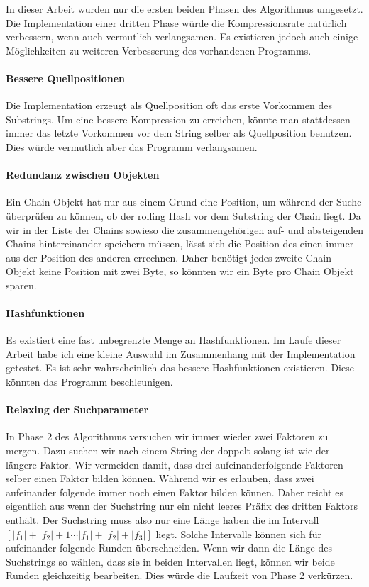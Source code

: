In dieser Arbeit wurden nur die ersten beiden Phasen des Algorithmus umgesetzt.
Die Implementation einer dritten Phase würde die Kompressionsrate natürlich verbessern, wenn auch vermutlich verlangsamen.
Es existieren jedoch auch einige  Möglichkeiten zu weiteren Verbesserung des vorhandenen Programms.
\paragraph{Bessere Quellpositionen}
Die Implementation erzeugt als Quellposition oft das erste Vorkommen des
Substrings. Um eine bessere Kompression zu erreichen, könnte man stattdessen
immer das letzte Vorkommen vor dem String selber als Quellposition
benutzen. Dies würde vermutlich aber das Programm verlangsamen.
\paragraph{Redundanz zwischen Objekten}
Ein Chain Objekt hat nur aus einem Grund eine Position, um während der
Suche überprüfen zu können, ob der rolling Hash vor dem Substring der
Chain liegt. Da wir in der Liste der Chains sowieso die
zusammengehörigen auf- und absteigenden Chains hintereinander speichern müssen,
lässt sich die Position des einen immer aus der Position des anderen
errechnen. Daher benötigt jedes zweite Chain Objekt keine Position mit
zwei Byte, so könnten wir ein Byte pro Chain Objekt sparen.
\paragraph{Hashfunktionen}
Es existiert eine fast unbegrenzte Menge an Hashfunktionen. Im Laufe
dieser Arbeit habe ich eine kleine Auswahl im Zusammenhang mit der
Implementation getestet. Es ist sehr wahrscheinlich das bessere
Hashfunktionen existieren. Diese könnten das Programm beschleunigen.
\paragraph{Relaxing der Suchparameter}
In Phase 2 des Algorithmus versuchen wir  immer wieder zwei Faktoren zu
mergen. Dazu suchen wir nach einem String der doppelt solang ist wie der
längere Faktor.
Wir vermeiden damit, dass drei aufeinanderfolgende Faktoren selber einen
Faktor bilden können. Während wir es erlauben, dass zwei aufeinander folgende
immer noch einen Faktor bilden können. Daher reicht es eigentlich aus wenn
der Suchstring nur ein nicht leeres Präfix des dritten Faktors enthält.
Der Suchstring muss also nur eine Länge haben die im Intervall
$[|f_1|+|f_2|+1\cdots|f_1|+|f_2|+|f_3|]$ liegt. Solche Intervalle können sich für aufeinander folgende Runden überschneiden. Wenn wir dann die Länge des Suchstrings so wählen, dass sie in beiden Intervallen liegt, können wir beide Runden gleichzeitig bearbeiten. Dies würde die Laufzeit von Phase 2 verkürzen.
